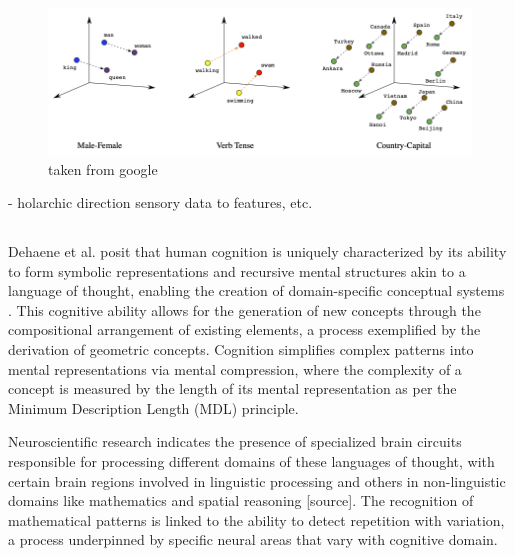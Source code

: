 \begin{figure}
    \centering
    \includegraphics[width=\textwidth]{../img/embeddings_analogies.png}
    \caption{taken from google}
    \label{}
\end{figure}






- holarchic direction sensory data to features, etc. 






\subsection{}

Dehaene et al. posit that human cognition is uniquely characterized by its ability to form symbolic representations and recursive mental structures akin to a language of thought, enabling the creation of domain-specific conceptual systems \cite{dehaene_symbols_2022}. This cognitive ability allows for the generation of new concepts through the compositional arrangement of existing elements, a process exemplified by the derivation of geometric concepts. Cognition simplifies complex patterns into mental representations via mental compression, where the complexity of a concept is measured by the length of its mental representation as per the Minimum Description Length (MDL) principle.

Neuroscientific research indicates the presence of specialized brain circuits responsible for processing different domains of these languages of thought, with certain brain regions involved in linguistic processing and others in non-linguistic domains like mathematics and spatial reasoning [source]. The recognition of mathematical patterns is linked to the ability to detect repetition with variation, a process underpinned by specific neural areas that vary with cognitive domain.

